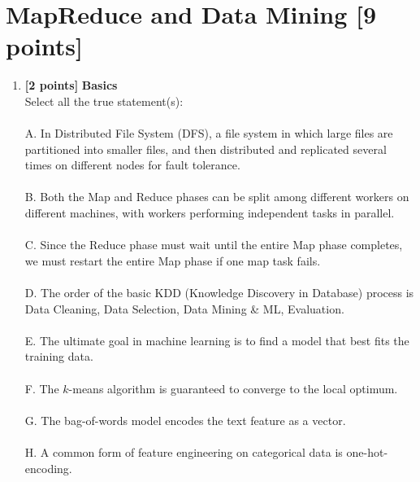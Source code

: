 \documentclass[10pt]{article}
\begin{document}
\newpage
\section{MapReduce and Data Mining \textbf{[9 points]}}

\begin{enumerate}

    \item \textbf{[2 points]} \textbf{Basics} \\
          Select all the true statement(s): \\ \\
          A. In Distributed File System (DFS), a file system in which large files are partitioned into smaller files,
          and then distributed and replicated several times on different nodes for fault tolerance. \\ \\
          B. Both the Map and Reduce phases can be split among different
          workers on different machines, with workers performing independent tasks in parallel. \\ \\
          C. Since the Reduce phase must wait until the entire Map phase completes, we must restart the entire Map phase if one map task
          fails. \\ \\
          D. The order of the basic KDD (Knowledge Discovery in Database) process is Data Cleaning, Data Selection, Data Mining \& ML, Evaluation. \\  \\
          E. The ultimate goal in machine learning is to find a model that best fits the training data. \\  \\
          F. The $k$-means algorithm is guaranteed to converge to the local optimum. \\ \\
          G. The bag-of-words model encodes the text feature as a vector. \\ \\
          H. A common form of feature engineering on categorical data is one-hot-encoding. \\ \\ \\ \\


\end{enumerate}
\end{document}
